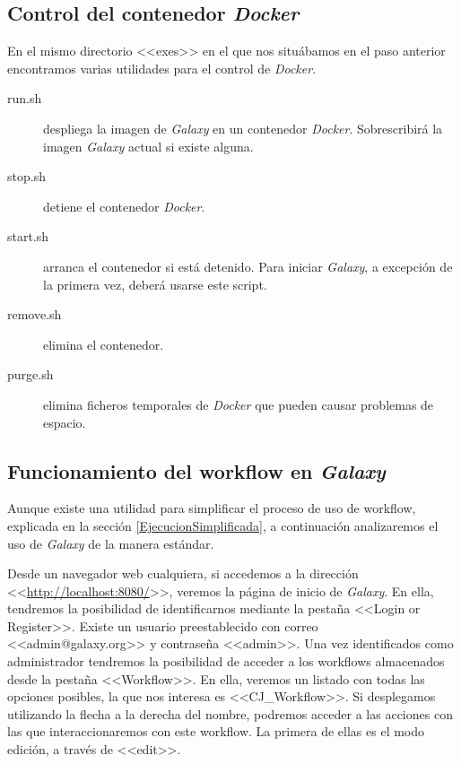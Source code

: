\subsection{Control del contenedor \textit{Docker}}
En el mismo directorio <<exes>> en el que nos situábamos en el paso anterior encontramos varias utilidades para el control de \textit{Docker}.
\begin{description}
    \item[run.sh] despliega la imagen de \textit{Galaxy} en un contenedor \textit{Docker}. Sobrescribirá la imagen \textit{Galaxy} actual si existe alguna.
    \item[stop.sh] detiene el contenedor \textit{Docker}.
    \item[start.sh] arranca el contenedor si está detenido. Para iniciar \textit{Galaxy}, a excepción de la primera vez, deberá usarse este script.
    \item[remove.sh] elimina el contenedor.
    \item[purge.sh] elimina ficheros temporales de \textit{Docker} que pueden causar problemas de espacio.
\end{description}


\subsection{Funcionamiento del workflow en \textit{Galaxy}}
Aunque existe una utilidad para simplificar el proceso de uso de workflow, explicada en la sección \ref{EjecucionSimplificada}, a continuación analizaremos el uso de \textit{Galaxy} de la manera estándar.

Desde un navegador web cualquiera, si accedemos a la dirección <<\url{http://localhost:8080/}>>, veremos la página de inicio de \textit{Galaxy}. En ella, tendremos la posibilidad de identificarnos mediante la pestaña <<Login or Register>>. Existe un usuario preestablecido con correo <<admin@galaxy.org>> y contraseña <<admin>>. Una vez identificados como administrador tendremos la posibilidad de acceder a los workflows almacenados desde la pestaña <<Workflow>>. En ella, veremos un listado con todas las opciones posibles, la que nos interesa es <<CJ\_Workflow>>. Si desplegamos utilizando la flecha a la derecha del nombre, podremos acceder a las acciones con las que interaccionaremos con este workflow. La primera de ellas es el modo edición, a través de <<edit>>. 

